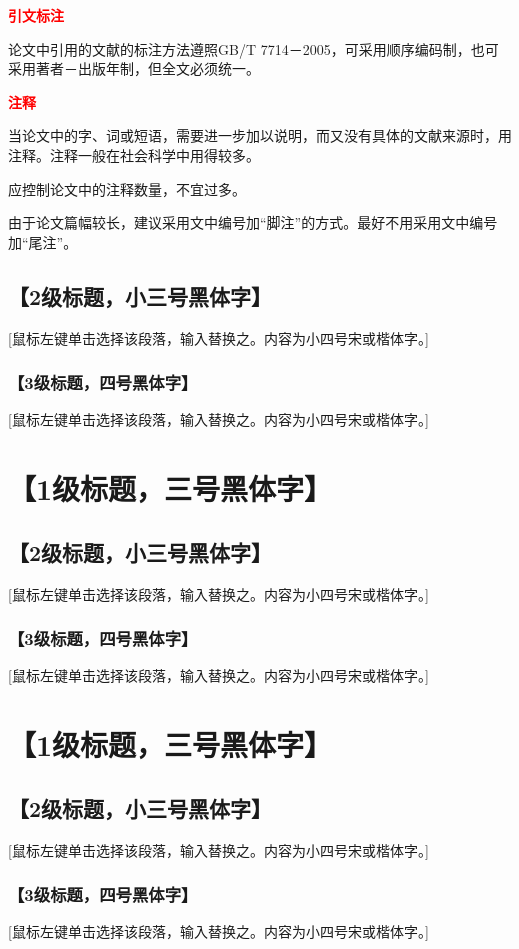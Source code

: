 \documentclass{bjtuthesis}
\begin{document}
\textcolor{red}{\textbf{引文标注}}\par
论文中引用的文献的标注方法遵照GB/T 7714－2005，可采用顺序编码制，也可采用著者－出版年制，但全文必须统一。\par
\textcolor{red}{\textbf{注释}}\par
当论文中的字、词或短语，需要进一步加以说明，而又没有具体的文献来源时，用注释。注释一般在社会科学中用得较多。\par
应控制论文中的注释数量，不宜过多。\par
由于论文篇幅较长，建议采用文中编号加“脚注”的方式。最好不用采用文中编号加“尾注”。\par

\section{【2级标题，小三号黑体字】 }
 [鼠标左键单击选择该段落，输入替换之。内容为小四号宋或楷体字。]
\subsection{【3级标题，四号黑体字】 }
[鼠标左键单击选择该段落，输入替换之。内容为小四号宋或楷体字。]

\chapter{【1级标题，三号黑体字】}
\section{【2级标题，小三号黑体字】 }
 [鼠标左键单击选择该段落，输入替换之。内容为小四号宋或楷体字。]
\subsection{【3级标题，四号黑体字】 }
[鼠标左键单击选择该段落，输入替换之。内容为小四号宋或楷体字。]

\chapter{【1级标题，三号黑体字】}
\section{【2级标题，小三号黑体字】 }
 [鼠标左键单击选择该段落，输入替换之。内容为小四号宋或楷体字。]
\subsection{【3级标题，四号黑体字】 }
[鼠标左键单击选择该段落，输入替换之。内容为小四号宋或楷体字。]
\end{document}
